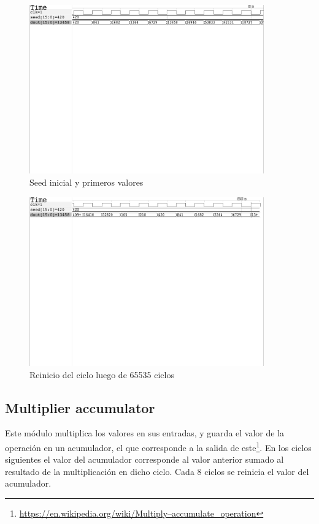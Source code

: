 \documentclass[letterpaper, 12pt]{article}
\numberwithin{equation}{section}
\begin{document}
\begin{figure}[H]
  \centering
  \includegraphics[width=0.9\textwidth]{../testbench/lfsr16/wave_lfsr_init.pdf}
  \caption{Seed inicial y primeros valores}
\end{figure}

\begin{figure}[H]
  \centering
  \includegraphics[width=0.9\textwidth]{../testbench/lfsr16/wave_lfsr_end.pdf}
  \caption{Reinicio del ciclo luego de 65535 ciclos}
\end{figure}

\subsection{Multiplier accumulator}

Este módulo multiplica los valores en sus entradas, y guarda el valor de la operación en un acumulador, el que corresponde a la salida de este\footnote{\url{https://en.wikipedia.org/wiki/Multiply–accumulate_operation}}. En los ciclos siguientes el valor del acumulador corresponde al valor anterior sumado al resultado de la multiplicación en dicho ciclo. Cada 8 ciclos se reinicia el valor del acumulador.
\end{document}
